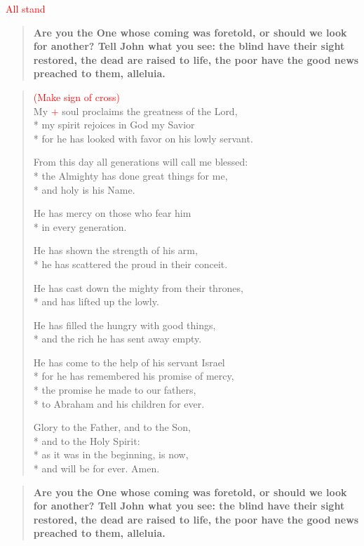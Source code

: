 \documentclass[letterpaper,14pt]{extarticle}
\newcommand{\side}[1]{\flagverse{\textcolor{red}{\textit{#1}}:}}
\newcommand{\rednote}[1]{\textcolor{red}{#1}}
\newlength{\oldindent}
\newcommand{\antiphon}[2]{
	\setlength{\oldindent}{\vindent}
	\setlength{\vindent}{0em}
	\begin{verse}
	\side{#1} \textbf{#2}
	\end{verse}
	\setlength{\vindent}{\oldindent}
}
\begin{document}
\rednote{All stand}
\antiphon{Leader}{Are you the One whose coming was foretold, or should we look for another? Tell John what you see: the blind have their sight restored, the dead are raised to life, the poor have the good news preached to them, alleluia.}
\begin{verse}
\rednote{(Make sign of cross)}\\
\side{All} My \rednote{+} soul proclaims the greatness of the Lord, \\*
my spirit rejoices in God my Savior \\*
for he has looked with favor on his lowly servant.

From this day all generations will call me blessed: \\*
the Almighty has done great things for me, \\*
and holy is his Name.

He has mercy on those who fear him \\*
in every generation.

He has shown the strength of his arm, \\*
he has scattered the proud in their conceit.

He has cast down the mighty from their thrones, \\*
and has lifted up the lowly.

He has filled the hungry with good things, \\*
and the rich he has sent away empty.

He has come to the help of his servant Israel \\*
for he has remembered his promise of mercy, \\*
the promise he made to our fathers, \\*
to Abraham and his children for ever.

Glory to the Father, and to the Son, \\*
and to the Holy Spirit: \\*
as it was in the beginning, is now, \\*
and will be for ever. Amen.
\end{verse}
\antiphon{All}{Are you the One whose coming was foretold, or should we look for another? Tell John what you see: the blind have their sight restored, the dead are raised to life, the poor have the good news preached to them, alleluia.}
\end{document}
